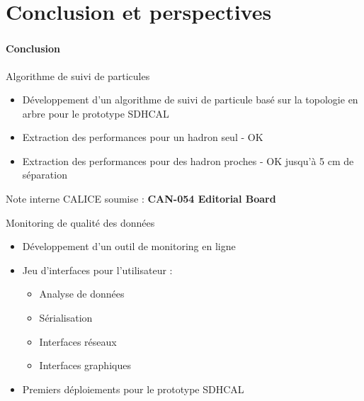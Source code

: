 \documentclass[8pt]{beamer}
\begin{document}
  \section{Conclusion et perspectives}
  
  \begin{frame}
  \frametitle{\secname}
    \tableofcontents[currentsection]
  \end{frame}
  
  \begin{frame}
  \frametitle{\secname}
  \framesubtitle{Conclusion}
    \begin{block}{Algorithme de suivi de particules}
      \begin{itemize}
        \item Développement d'un algorithme de suivi de particule basé sur la topologie en arbre pour le prototype SDHCAL
        \item Extraction des performances pour un hadron seul - OK
        \item Extraction des performances pour des hadron proches - OK jusqu'à 5 cm de séparation
      \end{itemize}
      Note interne CALICE soumise : \textbf{CAN-054 Editorial Board}
    \end{block}
    \begin{block}{Monitoring de qualité des données}
      \begin{itemize}
        \item Développement d'un outil de monitoring en ligne
        \item Jeu d'interfaces pour l’utilisateur :
        \begin{itemize}
          \item Analyse de données
          \item Sérialisation
          \item Interfaces réseaux
          \item Interfaces graphiques
        \end{itemize}
        \item Premiers déploiements pour le prototype SDHCAL
      \end{itemize}
    \end{block}
  \end{frame}
\end{document}

